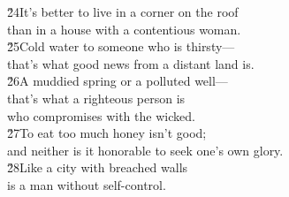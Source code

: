 \begin{poetry}
\poeml \v{24}It's better to live in a corner on the roof \\
\poemll    than in a house with a contentious woman. \\
\poeml \v{25}Cold water to someone who is thirsty--- \\
\poemll    that's what good news from a distant land is. \\
\poeml \v{26}A muddied spring or a polluted well--- \\
\poemll    that's what a righteous person is \\
\poemlll       who compromises with the wicked. \\
\poeml \v{27}To eat too much honey isn't good; \\
\poemll    and neither is it honorable to seek one's own glory. \\
\poeml \v{28}Like a city with breached walls \\
\poemll    is a man without self-control.
\end{poetry}

